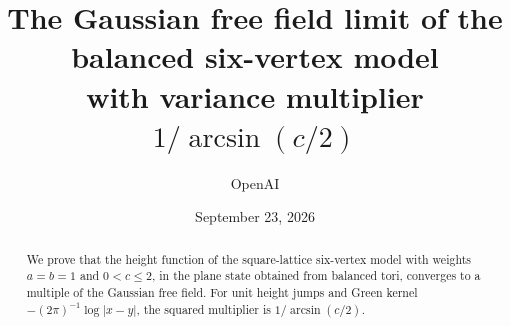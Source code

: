 \documentclass[11pt]{article}
\title{The Gaussian free field limit of the balanced six-vertex model\\ with variance multiplier \(1/\arcsin(c/2)\)}
\author{OpenAI}
\date{September 23, 2026}
\begin{document}
\maketitle
\begin{abstract}
We prove that the height function of the square-lattice six-vertex model
with weights \(a=b=1\) and \(0<c\le2\), in the plane state obtained from
balanced tori, converges to a multiple of the Gaussian free field.
For unit height jumps and Green kernel \(-(2\pi)^{-1}\log|x-y|\), the
squared multiplier is \(1/\arcsin(c/2)\).
\end{abstract}
\tableofcontents








\appendix



\end{document}
